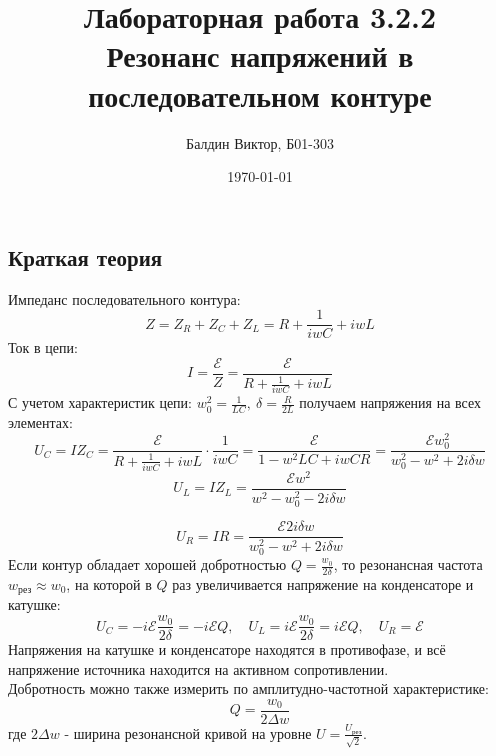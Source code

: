 \documentclass[a4paper, 12pt]{article}
\title{Лабораторная работа 3.2.2 \\ Резонанс напряжений в последовательном контуре}
\author{Балдин Виктор, Б01-303}
\date{\today}
\newcommand{\E}{\mathcal{E}}
\begin{document}
	\maketitle
	\subsection*{Краткая теория}
	Импеданс последовательного контура:
	\[Z = Z_R + Z_C + Z_L = R + \frac{1}{iwC} + iwL\]
	Ток в цепи:
	\[I = \frac{\E}{Z} = \frac{\E}{R + \frac{1}{iwC} + iwL}\]
	С учетом характеристик цепи: $w_0^2 = \frac{1}{LC}, \ \delta = \frac{R}{2L}$ получаем напряжения на всех элементах:
	\[U_C = IZ_C = \frac{\E}{R + \frac{1}{iwC} + iwL} \cdot \frac{1}{iwC} = \frac{\E}{1 - w^2LC + iwCR} = \frac{\E w_0^2}{w_0^2 - w^2 + 2i\delta w}\]
	\[U_L = IZ_L = \frac{\E w^2}{w^2 - w_0^2 - 2i\delta w}\]

	\[U_R = IR = \frac{\E 2i\delta w}{w_0^2 - w^2 + 2i\delta w}\]
	Если контур обладает хорошей добротностью $Q = \frac{w_0}{2\delta}$, то резонансная частота $w_\text{рез} \approx w_0$, на которой в $Q$ раз увеличивается напряжение на конденсаторе и катушке:
	\[U_C = -i\E \frac{w_0}{2\delta} = -i\E Q, \quad U_L = i\E \frac{w_0}{2\delta} = i\E Q, \quad U_R = \E \]
	Напряжения на катушке и конденсаторе находятся в противофазе, и всё напряжение источника находится на активном сопротивлении.\\
	Добротность можно также измерить по амплитудно-частотной характеристике: \[Q = \frac{w_0}{2\Delta w}\] где $2\Delta w$ - ширина резонансной кривой на уровне $U = \frac{U_{\text{рез}}}{\sqrt{2}}$.
\end{document}
